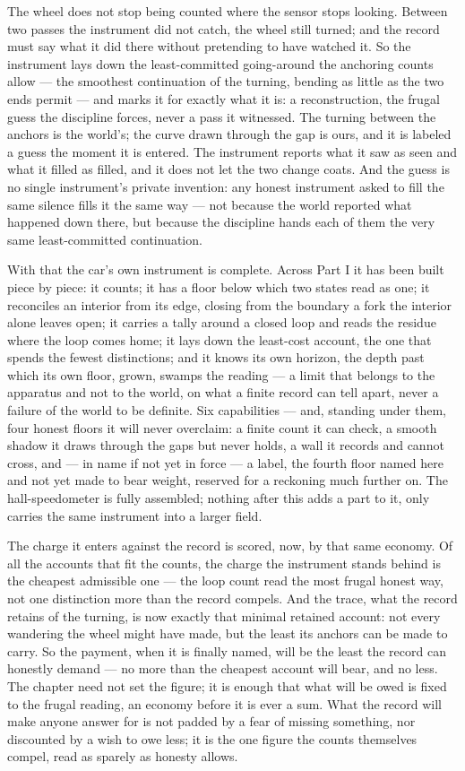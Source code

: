 The wheel does not stop being counted where the sensor stops looking. Between two passes the instrument did not
catch, the wheel still turned; and the record must say what it did there without pretending to have watched it.
So the instrument lays down the least-committed going-around the anchoring counts allow --- the smoothest
continuation of the turning, bending as little as the two ends permit --- and marks it for exactly what it is: a
reconstruction, the frugal guess the discipline forces, never a pass it witnessed. The turning between the
anchors is the world's; the curve drawn through the gap is ours, and it is labeled a guess the moment it is
entered. The instrument reports what it saw as seen and what it filled as filled, and it does not let the two
change coats. And the guess is no single instrument's private invention: any honest instrument asked to fill
the same silence fills it the same way --- not because the world reported what happened down there, but because
the discipline hands each of them the very same least-committed continuation.

With that the car's own instrument is complete. Across Part I it has been built piece by piece: it counts; it
has a floor below which two states read as one; it reconciles an interior from its edge, closing from the
boundary a fork the interior alone leaves open; it carries a tally around a closed loop and reads the residue
where the loop comes home; it lays down the least-cost account, the one that spends the fewest distinctions;
and it knows its own horizon, the depth past which its own floor, grown, swamps the reading --- a limit that
belongs to the apparatus and not to the world, on what a finite record can tell apart, never a failure of the
world to be definite. Six capabilities --- and, standing under them, four honest floors it will never
overclaim: a finite count it can check, a smooth shadow it draws through the gaps but never holds, a wall it
records and cannot cross, and --- in name if not yet in force --- a label, the fourth floor named here and not
yet made to bear weight, reserved for a reckoning much further on. The hall-speedometer is fully assembled;
nothing after this adds a part to it, only carries the same instrument into a larger field.

The charge it enters against the record is scored, now, by that same economy. Of all the accounts that fit the
counts, the charge the instrument stands behind is the cheapest admissible one --- the loop count read the most
frugal honest way, not one distinction more than the record compels. And the trace, what the record retains of
the turning, is now exactly that minimal retained account: not every wandering the wheel might have made, but
the least its anchors can be made to carry. So the payment, when it is finally named, will be the least the
record can honestly demand --- no more than the cheapest account will bear, and no less. The chapter need not
set the figure; it is enough that what will be owed is fixed to the frugal reading, an economy before it is
ever a sum. What the record will make anyone answer for is not padded by a fear of missing something, nor
discounted by a wish to owe less; it is the one figure the counts themselves compel, read as sparely as
honesty allows.

